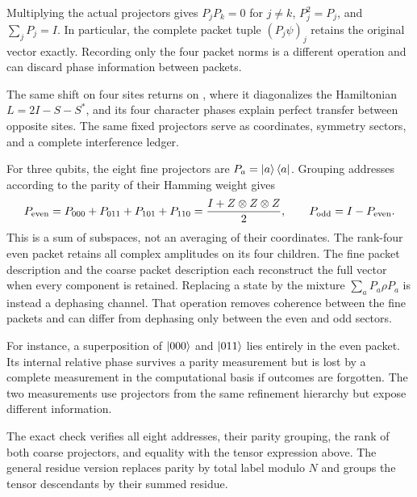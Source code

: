 Multiplying the actual projectors gives $P_jP_k=0$ for $j\ne k$, $P_j^2=P_j$, and $\sum_jP_j=I$. In particular, the complete packet tuple $(P_j\psi)_j$ retains the original vector exactly. Recording only the four packet norms is a different operation and can discard phase information between packets.

The same shift on four sites returns on , where it diagonalizes the Hamiltonian $L=2I-S-S^*$, and its four character phases explain perfect transfer between opposite sites. The same fixed projectors serve as coordinates, symmetry sectors, and a complete interference ledger.

For three qubits, the eight fine projectors are $P_a=\left|a\right\rangle\left\langle a\right|$. Grouping addresses according to the parity of their Hamming weight gives
\[
P_{\rm even}=P_{000}+P_{011}+P_{101}+P_{110}
=\frac{I+Z\otimes Z\otimes Z}{2},
\qquad P_{\rm odd}=I-P_{\rm even}.
\]
This is a sum of subspaces, not an averaging of their coordinates. The rank-four even packet retains all complex amplitudes on its four children.
The fine packet description and the coarse packet description each reconstruct the full vector when every component is retained. Replacing a state by the mixture $\sum_aP_a\rho P_a$ is instead a dephasing channel. That operation removes coherence between the fine packets and can differ from dephasing only between the even and odd sectors.

For instance, a superposition of $\left|000\right\rangle$ and $\left|011\right\rangle$ lies entirely in the even packet. Its internal relative phase survives a parity measurement but is lost by a complete measurement in the computational basis if outcomes are forgotten. The two measurements use projectors from the same refinement hierarchy but expose different information.

The exact check verifies all eight addresses, their parity grouping, the rank of both coarse projectors, and equality with the tensor expression above. The general residue version replaces parity by total label modulo $N$ and groups the tensor descendants by their summed residue.

